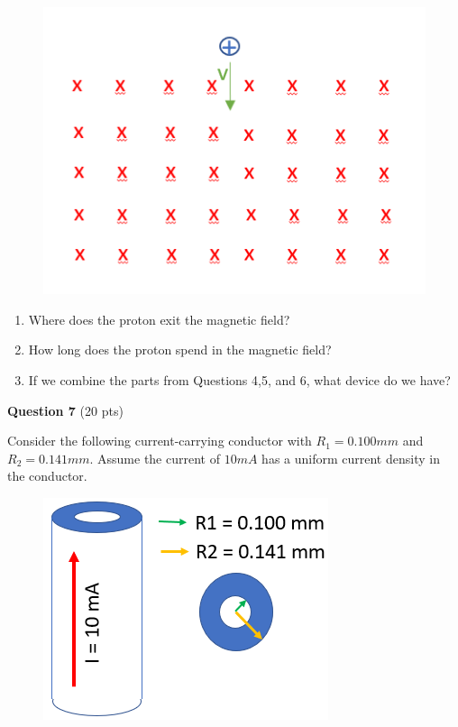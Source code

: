 \documentclass[14pt]{report}
\begin{document}
\begin{figure}[H]
\begin{center}
\includegraphics[scale=0.50]{final_4c.png}
\end{center}
\end{figure}

\begin{enumerate}[label=\Alph*]
\item Where does the proton exit the magnetic field?
\item How long does the proton spend in the magnetic field?
\item If we combine the parts from Questions 4,5, and 6, what device do we have?
\end{enumerate} 

\textbf{Question 7} (20 pts)

Consider the following current-carrying conductor with $R_1 = 0.100mm$ and $R_2 = 0.141mm$. Assume the current of $10 mA$ has a uniform current density in the conductor. 

\begin{figure}[H]
\begin{center}
\includegraphics[scale=0.7]{final_7.png}
\end{center}
\end{figure}
\end{document}
